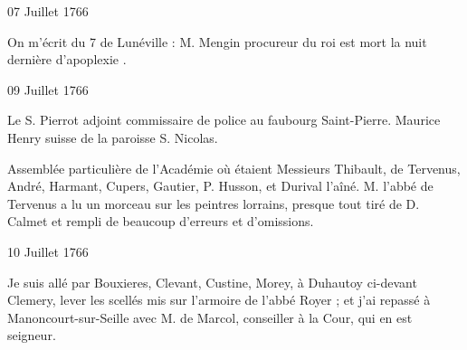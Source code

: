                      \begin{diary}{07 Juillet 1766}{}

                         On m'écrit du 7 de Lunéville : \og M.
                                 Mengin
                              procureur du roi est mort la nuit dernière d'apoplexie \fg{}. \bigskip


                     \end{diary}

                     \begin{diary}{09 Juillet 1766}{}


                           Le S. Pierrot adjoint commissaire de
                           police au
                              faubourg
                              Saint-Pierre. Maurice
                              Henry suisse
                           de la paroisse S. Nicolas.
                        \bigskip


                         Assemblée particulière de l'Académie où
                           étaient Messieurs
                           Thibault, de Tervenus, André,
                           Harmant, Cupers, Gautier,
                              P. Husson,
                           et Durival l'aîné. M. l'abbé de Tervenus
                           a lu un morceau sur les peintres lorrains,
                           presque tout tiré de D. Calmet et
                           rempli
                           de beaucoup d'erreurs et d'omissions. \bigskip


                     \end{diary}

                     \begin{diary}{10 Juillet 1766}{}

                         Je suis allé par Bouxieres, Clevant, Custine,
                           Morey, à Duhautoy
                           ci-devant
                           Clemery, lever les
                           scellés mis sur l'armoire de l'abbé
                              Royer ; et j'ai repassé à Manoncourt-sur-Seille avec M.
                              de Marcol, conseiller à la Cour, qui en est
                           seigneur. \bigskip


                     \end{diary}

